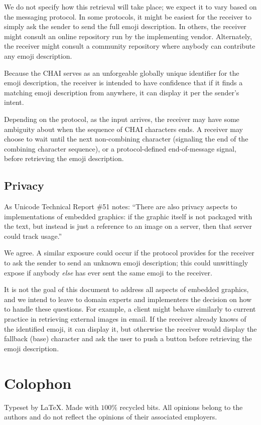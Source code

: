 \documentclass[12pt]{article}
\begin{document}
We do not specify how this retrieval will take place; we expect it to
vary based on the messaging protocol. In some protocols, it might be
easiest for the receiver to simply ask the sender to send the full
emoji description. In others, the receiver might consult an online
repository run by the implementing vendor. Alternately, the receiver
might consult a community repository where anybody can contribute any
emoji description.

Because the CHAI serves as an unforgeable globally unique identifier
for the emoji description, the receiver is intended to have confidence
that if it finds a matching emoji description from anywhere, it can
display it per the sender's intent.

Depending on the protocol, as the input arrives, the receiver may have
some ambiguity about when the sequence of CHAI characters ends.  A
receiver may choose to wait until the next non-combining character
(signaling the end of the combining character sequence), or a
protocol-defined end-of-message signal, before retrieving the emoji
description.

\subsection{Privacy}

As Unicode Technical Report \#51 notes: ``There are also privacy
aspects to implementations of embedded graphics: if the graphic itself
is not packaged with the text, but instead is just a reference to an
image on a server, then that server could track usage.''

We agree. A similar exposure could occur if the protocol provides
for the receiver to ask the sender to send an unknown emoji description;
this could unwittingly expose if anybody \emph{else} has ever sent the same
emoji to the receiver.

It is not the goal of this document to address all aspects of embedded
graphics, and we intend to leave to domain experts and implementers
the decision on how to handle these questions. For example, a client
might behave similarly to current practice in retrieving external
images in email. If the receiver already knows of the identified
emoji, it can display it, but otherwise the receiver would display the
fallback (base) character and ask the user to push a button before
retrieving the emoji description.




{}
\printbibliography
\section*{Colophon}

Typeset by \LaTeX . Made with \( 100\%  \) recycled bits.
All opinions belong to the authors and do not reflect the opinions
of their associated employers.
\end{document}
